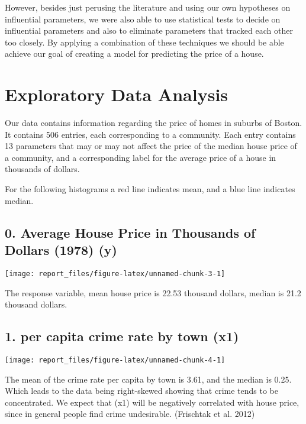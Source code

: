 \documentclass[]{article}
\begin{document}
However, besides just perusing the literature and using our own
hypotheses on influential parameters, we were also able to use
statistical tests to decide on influential parameters and also to
eliminate parameters that tracked each other too closely. By applying a
combination of these techniques we should be able achieve our goal of
creating a model for predicting the price of a house.

\section{Exploratory Data Analysis}\label{exploratory-data-analysis}

Our data contains information regarding the price of homes in suburbs of
Boston. It contains 506 entries, each corresponding to a community. Each
entry contains 13 parameters that may or may not affect the price of the
median house price of a community, and a corresponding label for the
average price of a house in thousands of dollars.

For the following histograms a red line indicates mean, and a blue line
indicates median.

\subsection{0. Average House Price in Thousands of Dollars (1978)
(y)}\label{average-house-price-in-thousands-of-dollars-1978-y}

\begin{center}\texttt{[image: report\_files/figure-latex/unnamed-chunk-3-1]} \end{center}

The response variable, mean house price is 22.53 thousand dollars,
median is 21.2 thousand dollars.

\subsection{1. per capita crime rate by town
(x1)}\label{per-capita-crime-rate-by-town-x1}

\begin{center}\texttt{[image: report\_files/figure-latex/unnamed-chunk-4-1]} \end{center}

The mean of the crime rate per capita by town is 3.61, and the median is
0.25. Which leads to the data being right-skewed showing that crime
tends to be concentrated. We expect that (x1) will be negatively
correlated with house price, since in general people find crime
undesirable. (Frischtak et al. 2012)
\end{document}
